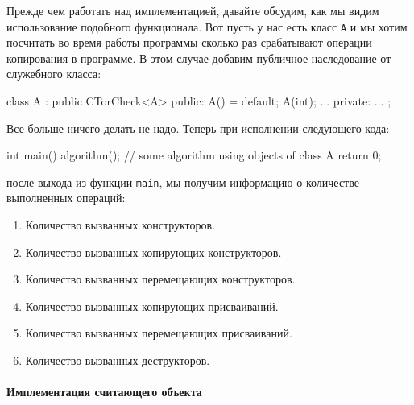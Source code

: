 Прежде чем работать над имплементацией, давайте обсудим, как мы видим использование подобного функционала.
Вот пусть у нас есть класс \verb"A" и мы хотим посчитать во время работы программы сколько раз срабатывают операции копирования в программе.
В этом случае добавим публичное наследование от служебного класса:
\begin{cppcode}
class A : public CTorCheck<A> {
public:
  A() = default;
  A(int);
  ...
private:
  ...
};
\end{cppcode}
Все больше ничего  делать не надо.
Теперь при исполнении следующего кода:
\begin{cppcode}
int main() {
  algorithm(); // some algorithm using objects of class A
  return 0;
}
\end{cppcode}
после выхода из функции \verb"main", мы получим информацию о количестве выполненных операций:
\begin{enumerate}
\item Количество вызванных конструкторов.

\item Количество вызванных копирующих конструкторов.

\item Количество вызванных перемещающих конструкторов.

\item Количество вызванных копирующих присваиваний.

\item Количество вызванных перемещающих присваиваний.

\item Количество вызванных деструкторов.
\end{enumerate}

\paragraph{Имплементация считающего объекта}

